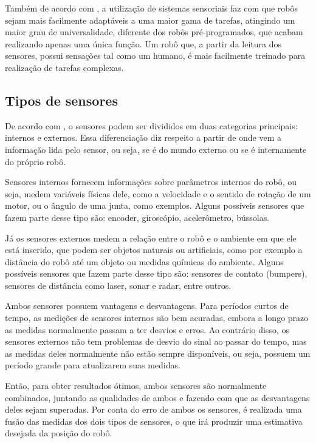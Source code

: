 \documentclass[acronym, symbols]{fei}
\begin{document}
		Também de acordo com \textcite{de2017tipos}, a utilização de sistemas sensoriais faz com que robôs sejam mais facilmente adaptáveis a uma maior gama de tarefas, atingindo um maior grau de universalidade, diferente dos robôs pré-programados, que acabam realizando apenas uma única função. Um robô que, a partir da leitura dos sensores, possui sensações tal como um humano, é mais facilmente treinado para realização de tarefas complexas.
		
		\subsection{Tipos de sensores}
		
			De acordo com \textcite{sensorFusionKalmanFilter}, o sensores podem ser divididos em duas categorias principais: internos e externos. Essa diferenciação diz respeito a partir de onde vem a informação lida pelo sensor, ou seja, se é do mundo externo ou se é internamente do próprio robô.
			
			Sensores internos fornecem informações sobre parâmetros internos do robô, ou seja, medem variáveis físicas dele, como a velocidade e o sentido de rotação de um motor, ou o ângulo de uma junta, como exemplos. Alguns possíveis sensores que fazem parte desse tipo são: encoder, giroscópio, acelerômetro, bússolas.
			
			Já os sensores externos medem a relação entre o robô e o ambiente em que ele está inserido, que podem ser objetos naturais ou artificiais, como por exemplo a distância do robô até um objeto ou medidas químicas do ambiente. Alguns possíveis sensores que fazem parte desse tipo são: sensores de contato (bumpers), sensores de distância como laser, sonar e radar, entre outros.
			
			Ambos sensores possuem vantagens e desvantagens. Para períodos curtos de tempo, as medições de sensores internos são bem acuradas, embora a longo prazo as medidas normalmente passam a ter desvios e erros. Ao contrário disso, os sensores externos não tem problemas de desvio do sinal ao passar do tempo, mas as medidas deles normalmente não estão sempre disponíveis, ou seja, possuem um período grande para atualizarem suas medidas.
			
			Então, para obter resultados ótimos, ambos sensores são normalmente combinados, juntando as qualidades de ambos e fazendo com que as desvantagens deles sejam superadas. Por conta do erro de ambos os sensores, é realizada uma fusão das medidas dos dois tipos de sensores, o que irá produzir uma estimativa desejada da posição do robô.
			
\end{document}
